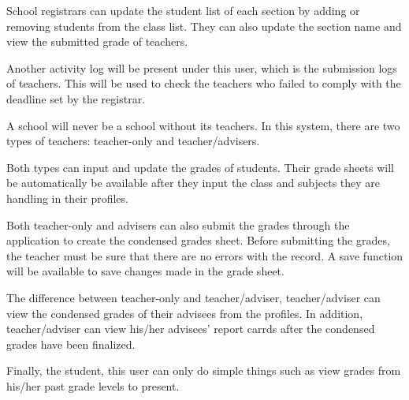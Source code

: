 \documentclass[11pt,a4paper,titlepage]{article}
\begin{document}
School registrars can update the student list of each section by adding or removing students from the class list. They can also update the section name and view the submitted grade of teachers.

Another activity log will be present under this user, which is the submission logs of teachers. This will be used to check the teachers who failed to comply with the deadline set by the registrar.

A school will never be a school without its teachers. In this system, there are two types of teachers: teacher-only and teacher/advisers.

Both types can input and update the grades of students. Their grade sheets will be automatically be available after they input the class and subjects they are handling in their profiles.

Both teacher-only and advisers can also submit the grades through the application to create the condensed grades sheet. Before submitting the grades, the teacher must be sure that there are no errors with the record. A save function will be available to save changes made in the grade sheet.

The difference between teacher-only and teacher/adviser, teacher/adviser can view the condensed grades of their advisees from the profiles. In addition, teacher/adviser can view his/her advisees' report carrds after the condensed grades have been finalized.

Finally, the student, this user can only do simple things such as view grades from his/her past grade levels to present.
\end{document}
